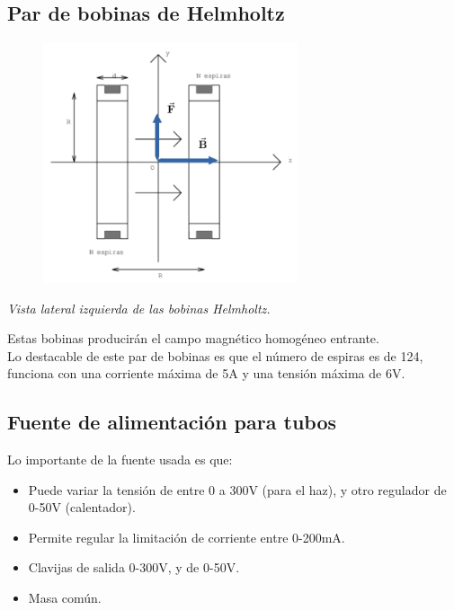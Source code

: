 \documentclass[a4paper]{article}
\begin{document}
    \subsection{Par de bobinas de Helmholtz}

        \begin{figure}[h!]
            \centering
            \includegraphics[width = 7.5cm] {../imagenes/dibujoBobinasHelmholtz.png}
        \end{figure}

        \begin{center}
            \textit{Vista lateral izquierda de las bobinas Helmholtz.}
        \end{center}

        \indent Estas bobinas producirán el campo magnético homogéneo entrante. \\


        \indent Lo destacable de este par de bobinas es que el número de espiras es de 124, funciona con una corriente máxima de 5A y una tensión máxima de 6V. \\

    \subsection{Fuente de alimentación para tubos}


        \indent Lo importante de la fuente usada es que:
        \begin{itemize}
            \item Puede variar la tensión de entre 0 a 300V (para el haz), y otro regulador de 0-50V (calentador).
            \item Permite regular la limitación de corriente entre 0-200mA.
            \item Clavijas de salida 0-300V, y de 0-50V.
            \item Masa común.
        \end{itemize}
\end{document}
